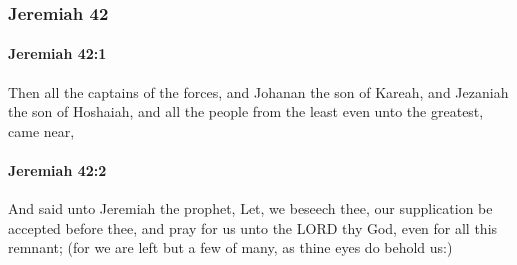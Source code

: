 	\subsubsection{Jeremiah 42} %
		\label{JEREMIAH-42}

		\paragraph{Jeremiah 42:1} %
			\label{JEREMIAH-42-1}

			Then all the captains of the forces, and Johanan the son of Kareah, and Jezaniah the son of Hoshaiah, and all the people from the least even unto the greatest, came near,


		\paragraph{Jeremiah 42:2} %
			\label{JEREMIAH-42-2}

			And said unto Jeremiah the prophet, Let, we beseech thee, our supplication be accepted before thee, and pray for us unto the LORD thy God, even for all this remnant; (for we are left but a few of many, as thine eyes do behold us:)

